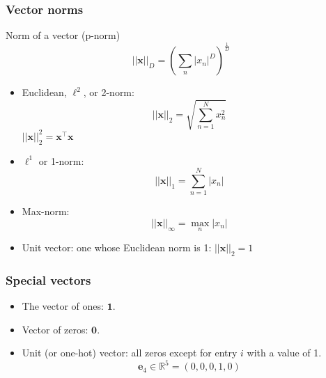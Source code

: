 \documentclass[smaller]{beamer}
\newcommand{\lt}{\left}
\newcommand{\rt}{\right}
\newcommand{\?}{\stackrel{?}{=}}
\newcommand{\fr}{\frac}
\newcommand{\mb}{\mathbb}
\newcommand{\tr}{^{\top}}
\begin{document}
\begin{frame}
  \frametitle{Vector norms}
  \pause
  Norm of a vector (p-norm) \pause
    \begin{equation}
      ||\bm x||_{D} = \lt(\sum_{n} |x_{n}|^{D}\rt)^{\fr1D}
    \end{equation}

    \pause
  \begin{itemize}
  \item Euclidean, $\ell^2$, or 2-norm:
    \pause
    \begin{equation}
      ||\bm x||_2 = \sqrt{\sum_{n=1}^N x_n^2}
    \end{equation}
    \pause           
    $||\bm x||_2^2 = \bm x\tr \bm x$
    \pause
  \item $\ell^1$ or 1-norm:\pause
    \begin{equation}
      ||\bm x||_1 = \sum_{n=1}^N |x_n|
    \end{equation}
    \pause
  \item Max-norm:\pause
    \begin{equation}
      ||\bm x ||_\infty = \max_n|x_n|
    \end{equation}


  \item Unit vector: one whose Euclidean norm is 1: \pause $||\bm x||_{2} =1$
    \pause

  \end{itemize}
\end{frame}
\begin{frame}
	\frametitle{Special vectors}
	\pause
	
	\begin{itemize}
		\item  The vector of ones: $\bm 1$.
		\pause
		
		\item Vector of zeros: $\bm 0$.
		
		\pause
		
		\item Unit (or one-hot) vector: all zeros except for entry $i$ with
		a value of 1.\pause
		\begin{equation}
			\bm e_4 \in \mb{R}^5 = (0,0,0,1,0)
		\end{equation}
	\end{itemize}
\end{frame}
\end{document}
